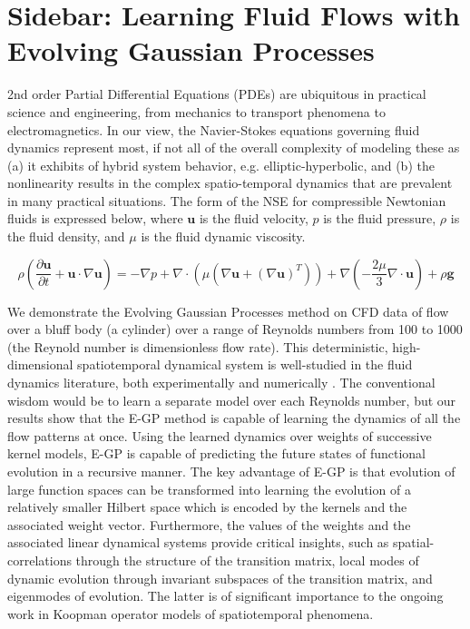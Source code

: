 \section[Learning Fluid Flows with Evolving Gaussian Processes]{Sidebar: Learning Fluid Flows with Evolving Gaussian Processes}\label{sb:cfd}

2nd order Partial Differential Equations (PDEs) are ubiquitous in practical science and engineering, from mechanics to transport phenomena to electromagnetics. In our view, the Navier-Stokes equations governing fluid dynamics represent most, if not all of the overall complexity of modeling these as (a) it exhibits of hybrid system behavior, e.g. elliptic-hyperbolic, and (b) the nonlinearity results in the complex spatio-temporal dynamics that are prevalent in many practical situations. The form of the NSE for compressible Newtonian fluids is expressed below, where $\mathbf u$ is the fluid velocity, $p$ is the fluid pressure, $\rho$ is the fluid density, and $\mu$ is the fluid dynamic viscosity. \cite{panton2006incompressible}

$$ \rho \left(\frac{\partial \mathbf u}{\partial t} + \mathbf u \cdot \nabla \mathbf u\right) = 
-\nabla p + \nabla \cdot \left(\mu (\nabla \mathbf u + (\nabla \mathbf u)^T)\right) + \nabla \left( - \frac{2\mu}{3}\nabla \cdot \mathbf u\right)
+ \rho \mathbf{g}$$

We demonstrate the Evolving Gaussian Processes method on CFD data of flow over a bluff body (a cylinder) over a range of Reynolds numbers from 100 to 1000 (the Reynold number is dimensionless flow rate). This deterministic, high-dimensional spatiotemporal dynamical system is well-studied in the fluid dynamics literature, both experimentally and numerically \cite{roshko1954cylinder, braza1986cylinder, rajani1986cylinder}. The conventional wisdom would be to learn a separate model over each Reynolds number, but our results show that the E-GP method is capable of learning the dynamics of all the flow patterns at once. Using the learned dynamics over weights of successive kernel models, E-GP is capable of predicting the future states of functional evolution in a recursive manner. The key advantage of E-GP is that evolution of large function spaces can be transformed into learning the evolution of a relatively smaller Hilbert space which is encoded by the kernels and the associated weight vector. Furthermore, the values of the weights and the associated linear dynamical systems provide critical insights, such as spatial-correlations through the structure of the transition matrix, local modes of dynamic evolution through invariant subspaces of the transition matrix, and eigenmodes of evolution. The latter is of significant importance to the ongoing work in Koopman operator models of spatiotemporal phenomena.


